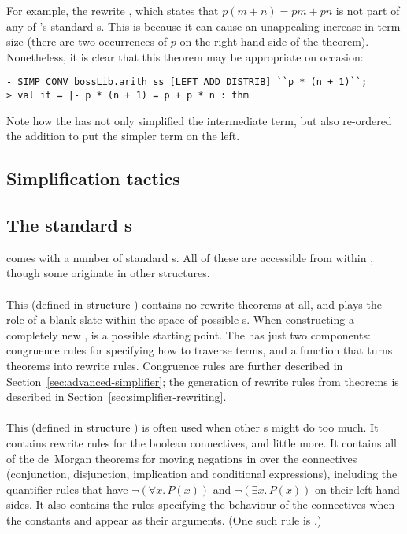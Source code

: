 For example, the rewrite , which
states that $p(m + n) = pm + pn$ is not part of any of \HOL's standard
\simpset{}s.  This is because it can cause an unappealing increase in
term size (there are two occurrences of $p$ on the right hand
side of the theorem).  Nonetheless, it is clear that this theorem may
be appropriate on occasion:
\begin{session}
\begin{verbatim}
- SIMP_CONV bossLib.arith_ss [LEFT_ADD_DISTRIB] ``p * (n + 1)``;
> val it = |- p * (n + 1) = p + p * n : thm
\end{verbatim}
\end{session}
Note how the  \simpset{} has not only simplified the
intermediate  term, but also re-ordered the addition to
put the simpler term on the left.

\subsection{Simplification tactics}

\subsection{The standard \simpset{}s}

\HOL{} comes with a number of standard \simpset{}s.  All of these are
accessible from within , though some originate in other
structures.

\paragraph{}
%
%
This \simpset{} (defined in structure ) contains no
rewrite theorems at all, and plays the role of a blank slate within
the space of possible \simpset{}s.  When constructing a completely new
\simpset,  is a possible starting point.  The
 \simpset{} has just two components: congruence rules for
specifying how to traverse terms, and a function that turns theorems
into rewrite rules.  Congruence rules are further described in
Section~\ref{sec:advanced-simplifier}; the generation of rewrite rules
from theorems is described in Section~\ref{sec:simplifier-rewriting}.

\paragraph{}
%
%
This \simpset{} (defined in structure ) is often used
when other \simpset{}s might do too much.  It contains rewrite rules
for the boolean connectives, and little more.  It contains all of the
de~Morgan theorems for moving negations in over the connectives
(conjunction, disjunction, implication and conditional expressions),
including the quantifier rules that have $\neg(\forall x.\,P(x))$ and
$\neg(\exists x.\,P (x))$ on their left-hand sides.  It also contains
the rules specifying the behaviour of the connectives when the
constants  and  appear as their arguments.  (One
such rule is .)

